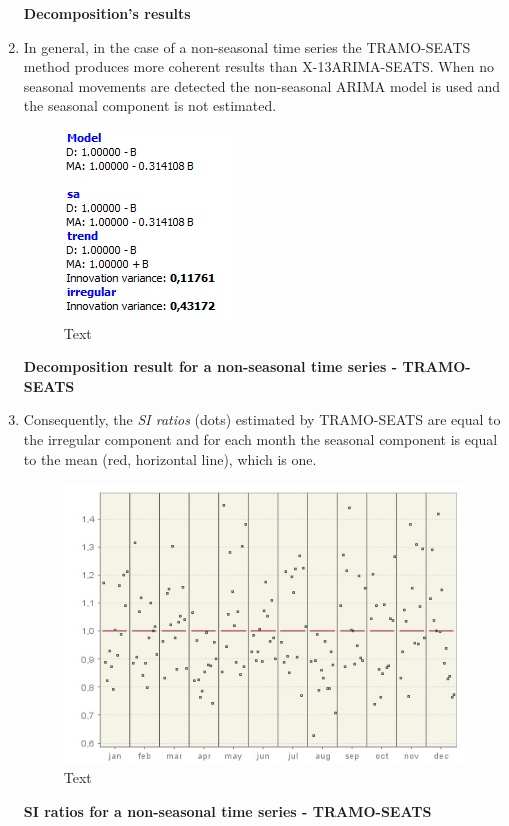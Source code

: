 \documentclass[
  letterpaper,
  DIV=11,
  numbers=noendperiod]{scrreprt}
\begin{document}
\begin{enumerate}
\begin{figure}
  \end{figure}

  \textbf{Decomposition's results}
\item
  In general, in the case of a non-seasonal time series the TRAMO-SEATS
  method produces more coherent results than X-13ARIMA-SEATS. When no
  seasonal movements are detected the non-seasonal ARIMA model is used
  and the seasonal component is not estimated.

  \begin{figure}

  {\centering \includegraphics{./All_images/UG_SA_image11.jpg}

  }

  \caption{Text}

  \end{figure}

  \textbf{Decomposition result for a non-seasonal time series -
  TRAMO-SEATS}
\item
  Consequently, the \emph{SI ratios} (dots) estimated by TRAMO-SEATS are
  equal to the irregular component and for each month the seasonal
  component is equal to the mean (red, horizontal line), which is one.

  \begin{figure}

  {\centering \includegraphics{./All_images/UG_SA_image12.jpg}

  }

  \caption{Text}

  \end{figure}

  \textbf{SI ratios for a non-seasonal time series - TRAMO-SEATS}
\end{enumerate}
\end{document}
